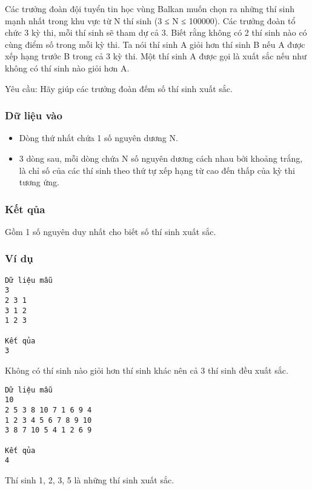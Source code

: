 



   Các trưởng đoàn đội tuyển tin học vùng Balkan muốn chọn ra những thí sinh mạnh nhất trong khu vực từ N thí sinh (3 ≤ N ≤ 100000). Các trưởng   đoàn tổ chức 3 kỳ thi, mỗi thí sinh sẽ tham dự cả 3. Biết rằng không có 2 thí sinh nào có cùng điểm số trong mỗi kỳ thi. Ta nói thí sinh A       giỏi   hơn      thí sinh B nếu A được xếp hạng trước B trong cả 3 kỳ thi. Một thí sinh A được gọi là       xuất sắc      nếu như không có thí sinh nào giỏi hơn   A.  

   Yêu cầu: Hãy giúp các trưởng đoàn đếm số thí sinh xuất sắc.  

\subsubsection{   Dữ liệu vào  }
\begin{itemize}
	\item     Dòng thứ nhất chứa 1 số nguyên dương N.   
	\item     3 dòng sau, mỗi dòng chứa N số nguyên dương cách nhau bởi khoảng trắng, là chỉ số của các thí sinh theo thứ tự xếp hạng từ cao đến thấp của kỳ   thi tương ứng.   
\end{itemize}

\subsubsection{   Kết qủa  }

   Gồm 1 số nguyên duy nhất cho biết số thí sinh xuất sắc.  

\subsubsection{   Ví dụ  }
\begin{verbatim}
Dữ liệu mẫu
3 
2 3 1
3 1 2
1 2 3

Kết qủa
3
\end{verbatim}

   Không có thí sinh nào giỏi hơn thí sinh khác nên cả 3 thí sinh đều xuất sắc.  
\begin{verbatim}
Dữ liệu mẫu
10 
2 5 3 8 10 7 1 6 9 4
1 2 3 4 5 6 7 8 9 10
3 8 7 10 5 4 1 2 6 9

Kết qủa
4
\end{verbatim}

   Thí sinh 1, 2, 3, 5 là những thí sinh xuất sắc.  